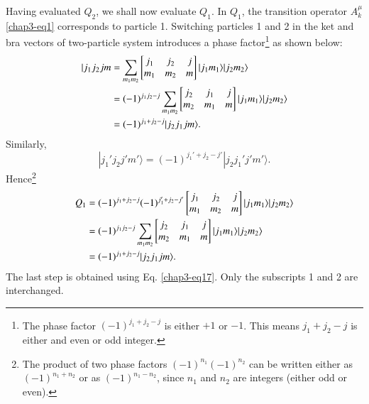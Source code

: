 Having evaluated $Q_2$, we shall now evaluate $Q_1$. In $Q_1$, the transition operator $A_k^\mu$ \eqref{chap3-eq1} corresponds to particle 1. Switching particles 1 and 2 in the ket and bra vectors of two-particle system introduces a phase factor\footnote{The phase factor $(-1)^{j_1 +j_2-j}$ is either $+1$ or $-1$. This means $j_1 + j_2-j$ is either and even or odd integer.}  as shown below:
\begin{align}
| j_1 j_2 j m 
& = \sum_{m_1m_2} \begin{bmatrix}j_1 & j_2 & j\\m_1 & m_2 & m\end{bmatrix} |j_1 m_1 \rangle| j_2 m_2\rangle \notag \\
& = (-1)^{j_1 j_2-j} \sum_{m_1 m_2} 
	\begin{bmatrix}j_2 & j_1 & j\\m_2 & m_1 & m \end{bmatrix} |j_1 m_1 \rangle | j_2 m_2 \rangle \notag \\
& = (-1)^{j_1 + j_2-j} | j_2 j_1 j m \rangle .\label{chap3-eq19}
\end{align}
Similarly,
\begin{equation}
|j_1' j_2 j' m' \rangle = (-1)^{j_1' + j_2 - j'} | j_2 j_1' j' m' \rangle . \label{chap3-eq20}
\end{equation}
Hence\footnote{The product of two phase factors $(-1)^{n_1} (-1)^{n_2}$ can be written either as $(-1)^{n_1 + n_2}$ or as $(-1)^{n_1-n_2}$, since $n_1$ and $n_2$ are integers (either odd or even).}
\begin{align}
Q_1 & = (-1)^{j_1 + j_2 -j} (-1)^{j_1' + j_2 -j' }
	\begin{bmatrix}j_1 & j_2 & j\\m_1 & m_2 & m\end{bmatrix} | j_1 m_1 \rangle | j_2 m_2 \rangle \notag \\
& = (-1)^{j_1 j_2-j} \sum_{m_1 m_2}
\begin{bmatrix}j_2 & j_1 & j\\m_2 & m_1 & m\end{bmatrix} | j_1 m_1 \rangle | j_2 m_2 \rangle \notag \\
& = (-1)^{j_1+j_2-j} | j_2 j_1 jm \rangle. \label{chap3-eq21}
\end{align}
The last step is obtained using Eq. \eqref{chap3-eq17}. Only the subscripts 1 and 2 are interchanged. 

